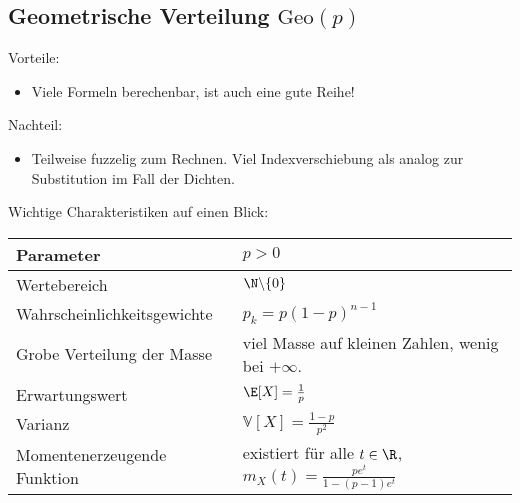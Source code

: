 \subsection{Geometrische Verteilung $\text{Geo}(p)$}

{Vorteile:} 
\begin{itemize}
	\item Viele Formeln berechenbar, ist auch eine gute Reihe!
\end{itemize}

Nachteil:
\begin{itemize}
	\item Teilweise fuzzelig zum Rechnen. Viel Indexverschiebung als analog zur Substitution im Fall der Dichten.
\end{itemize}


Wichtige Charakteristiken auf einen Blick:
\begin{center}
\begin{tabular}[h]{|l|l|}
\hline
Parameter& $p>0$ \\
\hline
Wertebereich & $\N\backslash \{0\}$\\
\hline
Wahrscheinlichkeitsgewichte& $p_k=p(1-p)^{n-1}$\\
\hline
Grobe Verteilung der Masse & viel Masse auf kleinen Zahlen, wenig bei $+\infty$.\\
\hline
Erwartungswert& $\E[X]=\frac 1 p$ \\
\hline
Varianz & $\mathbb V[X]=\frac{1-p}{p^2}$\\
\hline
Momentenerzeugende Funktion& existiert f\"ur alle $t\in \R$, $m_X(t)=\frac{pe^t}{1-(p-1)e^t}$\\
\hline
\end{tabular}
\end{center}


